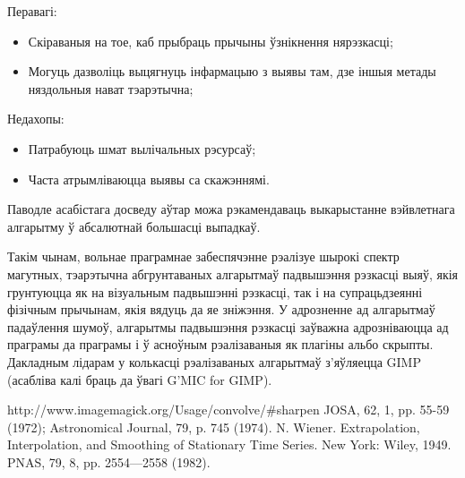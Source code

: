 \documentclass[10pt, a5paper]{article}
\begin{document}
Перавагі:

\begin{itemize}
  \item Скіраваныя на тое, каб прыбраць прычыны ўзнікнення нярэзкасці;
  \item Могуць дазволіць выцягнуць інфармацыю з выявы там, дзе іншыя метады няздольныя нават тэарэтычна;
\end{itemize}

Недахопы:

\begin{itemize}
  \item Патрабуюць шмат вылічальных рэсурсаў;
  \item Часта атрымліваюцца выявы са скажэннямі.
\end{itemize}

Паводле асабістага досведу аўтар можа рэкамендаваць выкарыстанне вэйвлетнага алгарытму ў абсалютнай большасці выпадкаў.

Такім чынам, вольнае праграмнае забеспячэнне рэалізуе шырокі спектр магутных, тэарэтычна абгрунтаваных алгарытмаў падвышэння рэзкасці выяў, якія грунтуюцца як на візуальным падвышэнні рэзкасці, так і на супрацьдзеянні фізічным прычынам, якія вядуць да яе зніжэння. У адрозненне ад алгарытмаў падаўлення шумоў, алгарытмы падвышэння рэзкасці заўважна адрозніваюцца ад праграмы да праграмы і ў асноўным рэалізаваныя як плагіны альбо скрыпты. Дакладным лідарам у колькасці рэалізаваных алгарытмаў з’яўляецца {GIMP} (асабліва калі браць да ўвагі {G'MIC} for {GIMP}).

\begin{thebibliography}{9}
 http://www.imagemagick.org/Usage/convolve/\#sharpen
 JOSA, 62, 1, pp. 55-59 (1972); Astronomical Journal, 79, p. 745 (1974).
 N. Wiener. Extrapolation, Interpolation, and Smoothing of Stationary Time Series. New York: Wiley, 1949.
 PNAS, 79, 8, pp. 2554—2558 (1982).
\end{thebibliography}
\end{document}
